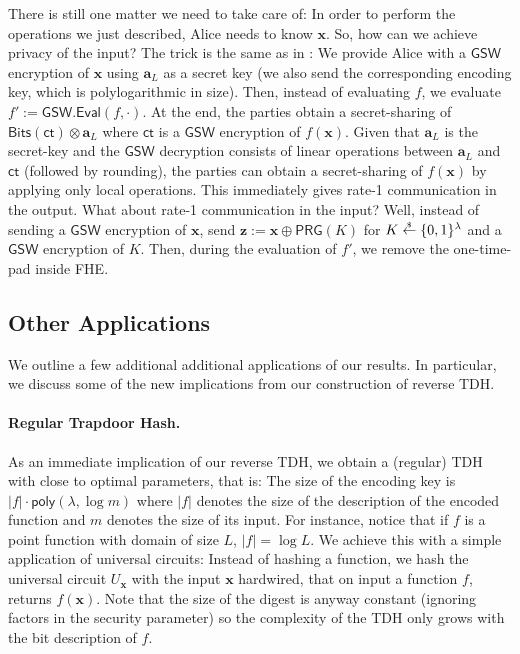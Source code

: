 \documentclass{article}
\newcommand{\getsr}{\overset{\raisebox{-1pt}{$\scriptscriptstyle \$$}}{\gets}}
\newcommand{\sample}{\getsr}
\newcommand{\GSW}{\mathsf{GSW}}
\newcommand{\poly}{\mathsf{poly}}
\renewcommand{\sec}{\ensuremath{\lambda}}
\newcommand{\ct}{\mathsf{ct}}
\newcommand{\algofont}[1]{\ensuremath{\mathsf{#1}}}
\newcommand{\Eval}{\algofont{Eval}\xspace}
\begin{document}
There is still one matter we need to take care of: In order to perform the operations we just described, Alice needs to know $\mathbf{x}$. So, how can we achieve privacy of the input? The trick is the same as in \cite{TCC:BTVW17}: We provide Alice with a $\mathsf{GSW}$ \cite{C:GenSahWat13} encryption of $\mathbf{x}$ using $\mathbf{a}_L$ as a secret key (we also send the corresponding encoding key, which is polylogarithmic in size). Then, instead of evaluating $f$, we evaluate $f':=\GSW.\Eval(f, \cdot)$. At the end, the parties obtain a secret-sharing of $\mathsf{Bits}(\ct)\otimes \mathbf{a}_L$ where $\ct$ is a $\GSW$ encryption of $f(\mathbf{x})$. Given that $\mathbf{a}_L$ is the secret-key and the $\GSW$ decryption consists of linear operations  between $\mathbf{a}_L$ and $\ct$ (followed by rounding), the parties can obtain a secret-sharing of $f(\mathbf{x})$ by applying only local operations. This immediately gives rate-1 communication in the output. What about rate-1 communication in the input? Well, instead of sending a $\GSW$ encryption of $\mathbf{x}$, send $\mathbf{z}:=\mathbf{x}\oplus \mathsf{PRG}(K)$ for $K\sample\{0, 1\}^\sec$ and a $\GSW$ encryption of $K$. Then, during the evaluation of $f'$, we remove the one-time-pad inside FHE.





\subsection{Other Applications}\label{sec:apps}

We outline a few additional additional applications of our results. In particular, we discuss some of the new implications from our construction of reverse TDH.

\paragraph{Regular Trapdoor Hash.}
As an immediate implication of our reverse TDH, we obtain a (regular) TDH \cite{C:DGIMMO19} with close to optimal parameters, that is: The size of the encoding key is $\lvert f\rvert \cdot \poly(\sec, \log m)$ where $\lvert f\rvert$ denotes the size of the description of the encoded function and $m$ denotes the size of its input. For instance, notice that if $f$ is a point function with domain of size $L$, $\lvert f\rvert=\log L$. 
We achieve this with a simple application of universal circuits: Instead of hashing a function, we hash the universal circuit $U_\mathbf{x}$ with the input $\mathbf{x}$ hardwired, that on input a function $f$, returns $f(\mathbf{x})$. Note that the size of the digest is anyway constant (ignoring factors in the security parameter) so the complexity of the TDH only grows with the bit description of $f$.
\end{document}
